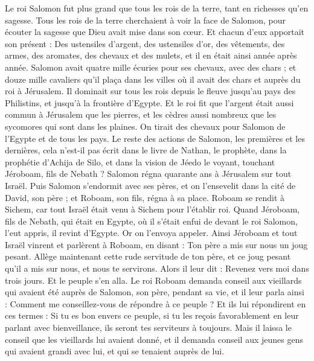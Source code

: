 \begin{multicols}{2}
Le roi Salomon fut plus grand que tous les rois de la terre, tant en richesses qu'en sagesse.
Tous les rois de la terre cherchaient à voir la face de Salomon, pour écouter la sagesse que Dieu avait mise dans son cœur.
Et chacun d'eux apportait son présent : Des ustensiles d'argent, des ustensiles d'or, des vêtements, des armes, des aromates, des chevaux et des mulets, et il en était ainsi année après année.
Salomon avait quatre mille écuries pour ses chevaux, avec des chars ; et douze mille cavaliers qu'il plaça dans les villes où il avait des chars et auprès du roi à Jérusalem.
Il dominait sur tous les rois depuis le fleuve jusqu'au pays des Philistins, et jusqu'à la frontière d'Egypte.
Et le roi fit que l'argent était aussi commun à Jérusalem que les pierres, et les cèdres aussi nombreux que les sycomores qui sont dans les plaines.
On tirait des chevaux pour Salomon de l'Egypte et de tous les pays.
Le reste des actions de Salomon, les premières et les dernières, cela n'est-il pas écrit dans le livre de Nathan, le prophète, dans la prophétie d'Achija de Silo, et dans la vision de Jéedo le voyant, touchant Jéroboam, fils de Nebath ?
Salomon régna quarante ans à Jérusalem sur tout Israël.
Puis Salomon s'endormit avec ses pères, et on l'ensevelit dans la cité de David, son père ; et Roboam, son fils, régna à sa place.
\VerseOne{}Roboam se rendit à Sichem, car tout Israël était venu à Sichem pour l'établir roi.
Quand Jéroboam, fils de Nebath, qui était en Egypte, où il s'était enfui de devant le roi Salomon, l'eut appris, il revint d'Egypte.
Or on l'envoya appeler. Ainsi Jéroboam et tout Israël vinrent et parlèrent à Roboam, en disant :
Ton père a mis sur nous un joug pesant. Allège maintenant cette rude servitude de ton père, et ce joug pesant qu'il a mis sur nous, et nous te servirons.
Alors il leur dit : Revenez vers moi dans trois jours. Et le peuple s'en alla.
Le roi Roboam demanda conseil aux vieillards qui avaient été auprès de Salomon, son père, pendant sa vie, et il leur parla ainsi : Comment me conseillez-vous de répondre à ce peuple ?
Et ils lui répondirent en ces termes : Si tu es bon envers ce peuple, si tu les reçois favorablement en leur parlant avec bienveillance, ils seront tes serviteurs à toujours.
Mais il laissa le conseil que les vieillards lui avaient donné, et il demanda conseil aux jeunes gens qui avaient grandi avec lui, et qui se tenaient auprès de lui.

\end{multicols}

